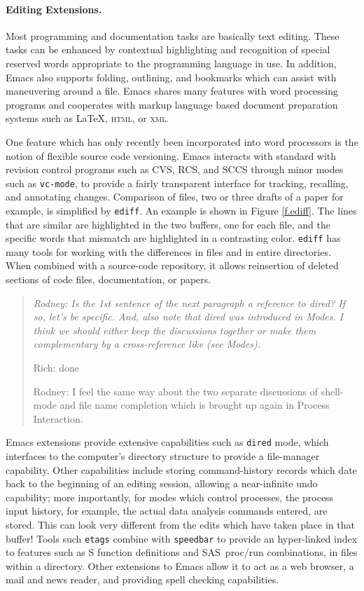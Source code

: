 \documentclass{article}
\newcommand*{\SAS}{\textsc{SAS}}
\newcommand{\stexttt}[1]{{\small\texttt{#1}}}
\newenvironment{Comment}{\begin{quote}\small\itshape }{\end{quote}}
\begin{document}
\paragraph{Editing Extensions.}
Most programming and documentation tasks are basically text editing.
These tasks can be enhanced by contextual highlighting and recognition
of special reserved words appropriate to the programming language in
use.  In addition, Emacs also supports folding, outlining, and
bookmarks which can assist with maneuvering around a file.  Emacs
shares many features with word processing programs and cooperates with
markup language based document preparation systems such as \LaTeX,
\textsc{html}, or \textsc{xml}.

One feature which has only recently been incorporated into word
processors is the notion of flexible source code versioning.  Emacs
interacts with standard with revision control programs such as CVS,
RCS, and SCCS through minor modes such as \stexttt{vc-mode}, to
provide a fairly transparent interface for tracking, recalling, and
annotating changes.
Comparison of files, two or three drafts of a paper for example, is
simplified by \stexttt{ediff}.  An example is shown in Figure
\ref{f.ediff}.  The lines that are similar are highlighted in the two
buffers, one for each file, and the specific words that mismatch are
highlighted in a contrasting color.  \stexttt{ediff} has many tools
for working with the differences in files and in entire directories.
When combined with a source-code repository, it allows reinsertion of
deleted sections of code files, documentation, or papers.

\begin{Comment} Rodney: Is the 1st sentence of the next paragraph
a reference to dired?  If so, let's be specific.  And, also note that 
dired was introduced in Modes.  I think we should either keep the 
discussions together or make them complementary by a cross-reference
like (see Modes).  

Rich: done

Rodney: I feel the same way about the two separate discussions 
of shell-mode and file name completion which is brought up again in 
Process Interaction.
\end{Comment}

Emacs extensions provide extensive capabilities such as
\stexttt{dired} mode,
which interfaces to the computer's directory structure to provide a
file-manager capability.  Other capabilities include storing
command-history records which date back to the beginning of an editing
session, allowing a near-infinite undo capability; more importantly,
for modes which control processes, the process input history, for
example, the actual data analysis commands entered, are stored.  This
can look very different from the edits which have taken place in that
buffer!  Tools such \stexttt{etags} combine with \stexttt{speedbar} to
provide an hyper-linked index to features such as S function
definitions and \SAS\ proc/run combinations, in files within a
directory.  Other extensions to Emacs allow it to act as a web
browser, a mail and news reader, and providing spell checking
capabilities.
\end{document}
